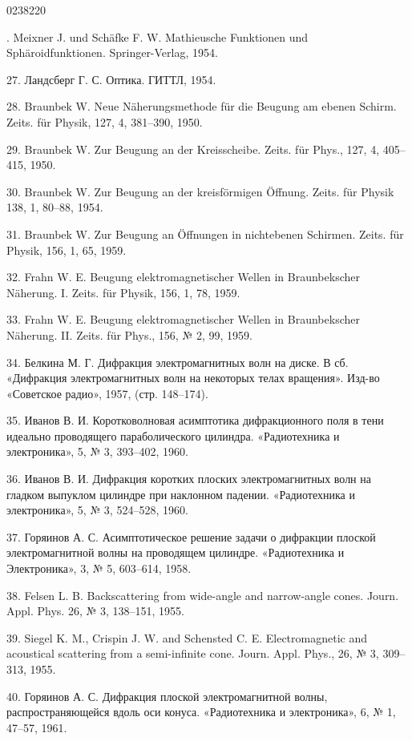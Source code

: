 \begin{scanpage}{0238}{220}
{\cyrillicfont\small
{}. Meixner J. und Schäfke F. W. Mathieusche Funktionen und Sphäroidfunktionen. Springer-Verlag, 1954.\par
27. Ландсберг Г. С. Оптика. ГИТТЛ, 1954.\par
28. Braunbek W. Neue Näherungsmethode für die Beugung am ebenen Schirm. Zeits. für Physik, 127, 4, 381--390, 1950.\par
29. Braunbek W. Zur Beugung an der Kreisscheibe. Zeits. für Phys., 127, 4, 405--415, 1950.\par
30. Braunbek W. Zur Beugung an der kreisförmigen Öffnung. Zeits. für Physik 138, 1, 80--88, 1954.\par
31. Braunbek W. Zur Beugung an Öffnungen in nichtebenen Schirmen. Zeits. für Physik, 156, 1, 65, 1959.\par
32. Frahn W. E. Beugung elektromagnetischer Wellen in Braunbekscher Näherung. I. Zeits. für Physik, 156, 1, 78, 1959.\par
33. Frahn W. E. Beugung elektromagnetischer Wellen in Braunbekscher Näherung. II. Zeits. für Phys., 156, № 2, 99, 1959.\par
34. Белкина М. Г. Дифракция электромагнитных волн на диске. В сб. «Дифракция электромагнитных волн на некоторых телах вращения». Изд-во «Советское радио», 1957, (стр. 148--174).\par
35. Иванов В. И. Коротковолновая асимптотика дифракционного поля в тени идеально проводящего параболического цилиндра. «Радиотехника и электроника», 5, № 3, 393--402, 1960.\par
36. Иванов В. И. Дифракция коротких плоских электромагнитных волн на гладком выпуклом цилиндре при наклонном падении. «Радиотехника и электроника», 5, № 3, 524--528, 1960.\par
37. Горяинов А. С. Асимптотическое решение задачи о дифракции плоской электромагнитной волны на проводящем цилиндре. «Радиотехника и Электроника», 3, № 5, 603--614, 1958.\par
38. Felsen L. B. Backscattering from wide-angle and narrow-angle cones. Journ. Appl. Phys. 26, № 3, 138--151, 1955.\par
39. Siegel K. M., Crispin J. W. and Schensted C. E. Electromagnetic and acoustical scattering from a semi-infinite cone. Journ. Appl. Phys., 26, № 3, 309--313, 1955.\par
40. Горяинов А. С. Дифракция плоской электромагнитной волны, распространяющейся вдоль оси конуса. «Радиотехника и электроника», 6, № 1, 47--57, 1961.\par
}
\end{scanpage}
